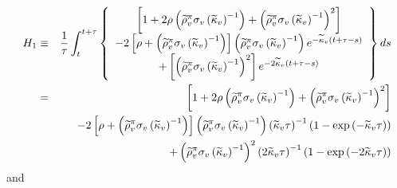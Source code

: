 \documentclass{article}
\begin{document}
\begin{eqnarray*}
H_{1} &\equiv &\frac{1}{\tau }\int_{t}^{t+\tau }\left\{ 
\begin{array}{c}
\left[ 1+2\rho \left( \widetilde{\rho }_{v}^{\pi }\sigma _{v}\left( 
\widetilde{\kappa }_{v}\right) ^{-1}\right) +\left( \widetilde{\rho }%
_{v}^{\pi }\sigma _{v}\left( \widetilde{\kappa }_{v}\right) ^{-1}\right) ^{2}%
\right]  \\ 
-2\left[ \rho +\left( \widetilde{\rho }_{v}^{\pi }\sigma _{v}\left( 
\widetilde{\kappa }_{v}\right) ^{-1}\right) \right] \left( \widetilde{\rho }%
_{v}^{\pi }\sigma _{v}\left( \widetilde{\kappa }_{v}\right) ^{-1}\right) e^{-%
\widetilde{\kappa }_{v}\left( t+\tau -s\right) } \\ 
+\left[ \left( \widetilde{\rho }_{v}^{\pi }\sigma _{v}\left( \widetilde{%
\kappa }_{v}\right) ^{-1}\right) ^{2}\right] e^{-2\widetilde{\kappa }%
_{v}\left( t+\tau -s\right) }%
\end{array}%
\right\} ds \\
&=&\left[ 1+2\rho \left( \widetilde{\rho }_{v}^{\pi }\sigma _{v}\left( 
\widetilde{\kappa }_{v}\right) ^{-1}\right) +\left( \widetilde{\rho }%
_{v}^{\pi }\sigma _{v}\left( \widetilde{\kappa }_{v}\right) ^{-1}\right) ^{2}%
\right]  \\
&&-2\left[ \rho +\left( \widetilde{\rho }_{v}^{\pi }\sigma _{v}\left( 
\widetilde{\kappa }_{v}\right) ^{-1}\right) \right] \left( \widetilde{\rho }%
_{v}^{\pi }\sigma _{v}\left( \widetilde{\kappa }_{v}\right) ^{-1}\right)
\left( \widetilde{\kappa }_{v}\tau \right) ^{-1}\left( 1-\exp \left( -%
\widetilde{\kappa }_{v}\tau \right) \right)  \\
&&+\left( \widetilde{\rho }_{v}^{\pi }\sigma _{v}\left( \widetilde{\kappa }%
_{v}\right) ^{-1}\right) ^{2}\left( 2\widetilde{\kappa }_{v}\tau \right)
^{-1}\left( 1-\exp \left( -2\widetilde{\kappa }_{v}\tau \right) \right) 
\end{eqnarray*}%
and%
\end{document}
